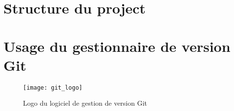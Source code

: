 \appendix
\chapter{Structure du project}
\chapter{Usage du gestionnaire de version Git}

\begin{figure}
\center
\texttt{[image: git\_logo]}
\caption{Logo du logiciel de gestion de version Git}
\label{fig:git}
\end{figure}
